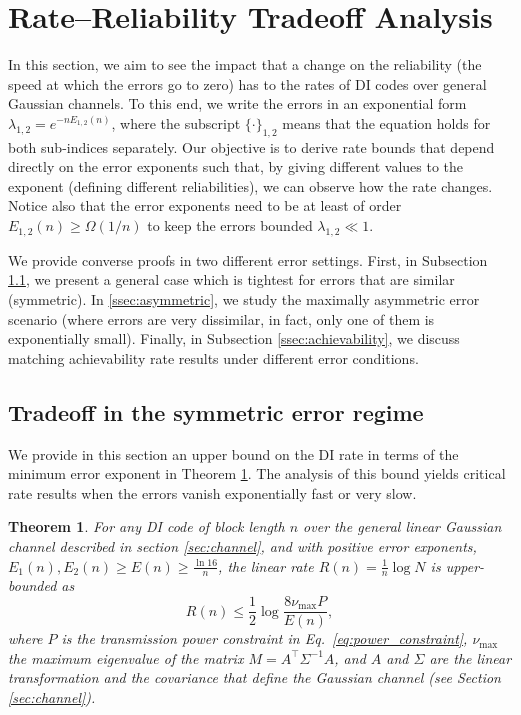 \documentclass[10pt,conference]{IEEEtran}
\newtheorem{theorem}{Theorem}
\newcommand{\1}{\mathds{1}}
\begin{document}
\section{Rate–Reliability Tradeoff Analysis}
\label{sec:results}
In this section, we aim to see the impact that a change on the reliability (the speed at which the errors go to zero) has to the rates of DI codes over general Gaussian channels. To this end, we write the errors in an exponential form $\lambda_{1,2}=e^{-nE_{1,2}(n)}$, where the subscript $\{\cdot\}_{1,2}$ means that the equation holds for both sub-indices separately. Our objective is to derive rate bounds that depend directly on the error exponents such that, by giving different values to the exponent (defining different reliabilities), we can observe how the rate changes. Notice also that the error exponents need to be at least of order $E_{1,2}(n)\geq\Omega(1/n)$ to keep the errors bounded $\lambda_{1,2}\ll 1$. 

We provide converse proofs in two different error settings. First, in Subsection \ref{ssec:converse}, we present a general case which is tightest for errors that are similar (symmetric). 
In \ref{ssec:asymmetric}, we study the maximally asymmetric error scenario (where errors are very dissimilar, in fact, only one of them is exponentially small). Finally, in Subsection \ref{ssec:achievability}, we discuss matching achievability rate results under different error conditions.


\subsection{Tradeoff in the symmetric error regime}
\label{ssec:converse}
We provide in this section an upper bound on the DI rate in terms of the minimum error exponent in Theorem \ref{thm:RR_upperbound}. The analysis of this bound yields critical rate results when the errors vanish exponentially fast or very slow.

\begin{theorem}
\label{thm:RR_upperbound}
For any DI code of block length $n$ over the general linear Gaussian channel described in section \ref{sec:channel}, and with positive error exponents, $E_1(n), E_2(n) \geq E(n) \geq \frac{\ln 16}{n}$, the linear rate $R(n)=\frac1n \log N$ is upper-bounded as
\[
  R(n) \leq \frac12\log\frac{8\nu_{\max}P}{E(n)},
\]
where $P$ is the transmission power constraint in Eq.~\eqref{eq:power_constraint}, $\nu_{\max}$ the maximum eigenvalue of the matrix $M=A^\top\Sigma^{-1}A$, and $A$ and $\Sigma$ are the linear transformation and the covariance that define the Gaussian channel (see Section \ref{sec:channel}).
\end{theorem}
\end{document}
